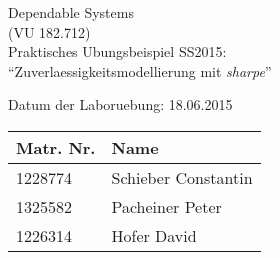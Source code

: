 \begin{titlepage}

\begin{center}
\vspace*{1.3cm}
{\Huge Dependable Systems\\(VU 182.712)\\}
\vspace{1.7cm}
{\LARGE Praktisches Ubungsbeispiel SS2015:\\``Zuverlaessigkeitsmodellierung mit \textit{sharpe}''\\}
\vspace{1.7cm}


{\hspace{1cm} Datum der Laboruebung: 18.06.2015}


\begin{table}[h!]
\centering
\begin{tabular}{|p{3.5cm}|p{6.5cm}|}
\hline \textbf{Matr. Nr.} & \textbf{Name} \\
\hline
1228774 &  Schieber Constantin \\
\hline
1325582 &  Pacheiner Peter \\
\hline
1226314 & Hofer David \\
\hline
\end{tabular}
\end{table}

\end{center}
\vspace{1.0cm}

\end{titlepage}
\setcounter{page}{2}




